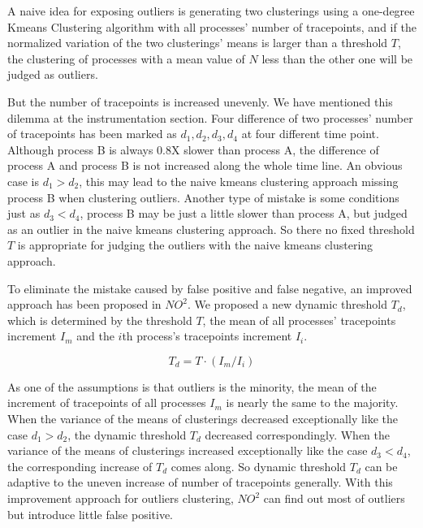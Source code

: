 A naive idea for exposing outliers is generating two clusterings using a one-degree Kmeans Clustering algorithm with all processes' number of tracepoints, and if the normalized variation of the two clusterings' means is larger than a threshold $T$, the clustering of processes with a mean value of $N$ less than the other one will be judged as outliers.

But the number of tracepoints is increased unevenly. We have mentioned this dilemma at the instrumentation section. Four difference of two processes' number of tracepoints has been marked as $d_1, d_2, d_3, d_4$ at four different time point. Although process B is always 0.8X slower than process A, the difference of process A and process B is not increased along the whole time line. An obvious case is $d_1 > d_2$, this may lead to the naive kmeans clustering approach missing process B when clustering outliers. Another type of mistake is some conditions just as $d_3 < d_4$, process B may be just a little slower than process A, but judged as an outlier in the naive kmeans clustering approach. So there no fixed threshold $T$ is appropriate for judging the outliers with the naive kmeans clustering approach.

To eliminate the mistake caused by false positive and false negative, an improved approach has been proposed in $NO^2$. We proposed a new dynamic threshold $T_d$, which is determined by the threshold $T$, the mean of all processes' tracepoints increment $I_m$ and the $i$th process's tracepoints increment $I_i$.

$$T_d = T \cdot (I_m / I_i)$$

As one of the assumptions is that outliers is the minority, the mean of the increment of tracepoints of all processes $I_m$ is nearly the same to the majority. When the variance of the means of clusterings decreased exceptionally like the case $d_1 > d_2$, the dynamic threshold $T_d$ decreased correspondingly. When the variance of the means of clusterings increased exceptionally like the case $d_3 < d_4$, the corresponding increase of $T_d$ comes along. So dynamic threshold $T_d$ can be adaptive to the uneven increase of number of tracepoints generally. With this improvement approach for outliers clustering, $NO^2$ can find out most of outliers but introduce little false positive. 
